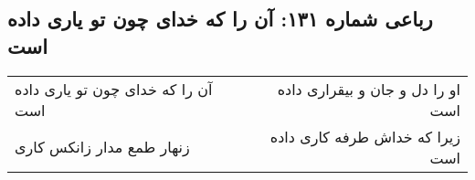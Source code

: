 \begin{center}
\section*{رباعی شماره ۱۳۱: آن را که خدای چون تو یاری داده است}
\label{sec:0131}
\begin{longtable}{l p{0.5cm} r}
آن را که خدای چون تو یاری داده است
&&
او را دل و جان و بیقراری داده است
\\
زنهار طمع مدار زانکس کاری
&&
زیرا که خداش طرفه کاری داده است
\\
\end{longtable}
\end{center}
